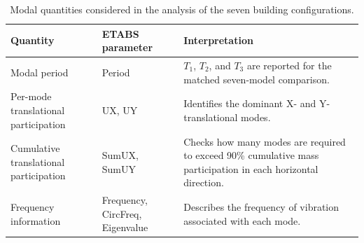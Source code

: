 \begin{table}[!htbp]
\centering
\caption{Modal quantities considered in the analysis of the seven building configurations.}
\label{tab:modal_extraction_fields}
\small
\begin{tabular}{@{}p{3.5cm}p{4.0cm}p{6.1cm}@{}}
\toprule
Quantity & ETABS parameter & Interpretation \\
\midrule
Modal period & Period & $T_1$, $T_2$, and $T_3$ are reported for the matched seven-model comparison. \\
Per-mode translational participation & UX, UY & Identifies the dominant X- and Y-translational modes. \\
Cumulative translational participation & SumUX, SumUY & Checks how many modes are required to exceed 90\% cumulative mass participation in each horizontal direction. \\
Frequency information & Frequency, CircFreq, Eigenvalue & Describes the frequency of vibration associated with each mode. \\
\bottomrule
\end{tabular}
\end{table}
